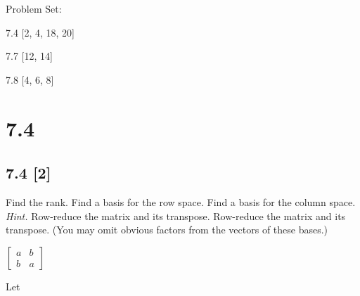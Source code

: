 \documentclass{article}
\begin{document}
{\large \noindent Problem Set:}

\par 7.4 [2, 4, 18, 20]
\par 7.7 [12, 14]
\par 7.8 [4, 6, 8]
\vspace{5mm}

\noindent \hrulefill

\section*{7.4}
\setcounter{equation}{0}

\subsection*{7.4 [2]}

Find the rank.  Find a basis for the row space.  Find a basis for the column space.  \textit{Hint.}  Row-reduce the matrix and its transpose.  Row-reduce the matrix and its transpose.  (You may omit obvious factors from the vectors of these bases.) 

\begin{center}
    $\begin{bmatrix} 
    a & b\\
    b & a
    \end{bmatrix}$
\end{center}

Let
\end{document}
